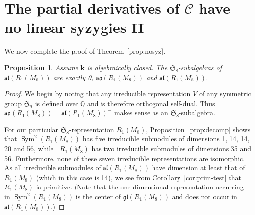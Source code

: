 \documentclass{amsart}
\newtheorem{proposition}[theorem]{Proposition}
\theoremstyle{definition}
\theoremstyle{remark}
\DeclareMathOperator{\Sym}{Sym}
\DeclareMathOperator{\bw}{{\bigwedge}^{\! 2}}
\def\SS{\mathfrak{S}}
\def\fieldk{\mathbf{k}}
\def\Q{\mathbb{Q}}
\def\cubic{\mathcal{C}}
\let\mf\mathfrak
\begin{document}
\section{The partial derivatives of $\cubic$ have no linear syzygies II}
\label{s:syzygy3}

We now complete the proof of Theorem~\ref{prop:nosyz}.  

\begin{proposition}
\label{prop:subalg}
Assume $\fieldk$ is algebraically closed.  The $\SS_8$-subalgebras of $\mf{sl}(R_1(M_8))$ are exactly 0,
$\mf{so}(R_1(M_8))$ and $\mf{sl}(R_1(M_8))$.
\end{proposition}

\begin{proof}
We begin by noting that any irreducible representation $V$ of any symmetric group $\SS_n$ is defined over $\Q$ and is
therefore orthogonal self-dual.  Thus $\mf{so}(R_1(M_8))=\mf{sl}(R_1(M_8))^-$ makes sense as an $\SS_8$-subalgebra.

For our particular $\SS_8$-representation $R_1(M_8)$, Proposition~\ref{prop:decomp} shows that $\Sym^2(R_1(M_8))$ has
five irreducible submodules of dimensions 1, 14, 14, 20 and 56, while $\bw{R_1(M_8)}$ has two irreducible submodules of
dimensions 35 and 56.  Furthermore, none of these seven irreducible representations are isomorphic.  As all irreducible submodules of
$\mf{sl}(R_1(M_8))$ have dimension at least that of $R_1(M_8)$ (which in this case is 14), we see from
Corollary~\ref{cor:prim-test} that $R_1(M_8)$ is primitive.  (Note that the one-dimensional representation occurring
in $\Sym^2(R_1(M_8))$ is the center of $\mf{gl}(R_1(M_8))$ and does not occur in $\mf{sl}(R_1(M_8))$.)


\end{proof}
\end{document}
